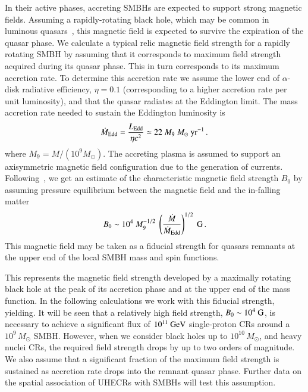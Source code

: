 \documentclass[aps,prd,twocolumn,superscriptaddress,tightenlines,nofootinbib]{revtex4-1}
\begin{document}
In their active phases, accreting SMBHs are expected to support strong
magnetic fields. Assuming a rapidly-rotating black hole, which may be
common in luminous quasars~\cite{Cao:2008pd,Volonteri:2007tu}, this
magnetic field is expected to survive the expiration of the quasar
phase. We calculate a typical relic magnetic field strength for a
rapidly rotating SMBH by assuming that it corresponds to maximum field
strength acquired during its quasar phase.  This in
turn corresponds to its maximum accretion rate. To determine this
accretion rate we assume the lower end of $\alpha$-disk radiative
efficiency, $\eta = 0.1$ (corresponding to a higher accretion rate per
unit luminosity), and that the quasar radiates at the Eddington
limit. The mass accretion rate needed to sustain the Eddington
luminosity is
\begin{equation}
\dot{M}_{\rm Edd} = \frac{L_{\rm Edd}}{\eta c^2} \simeq 22  \ M_9 \ M_\odot~{\rm yr}^{-1} \, .
\end{equation}
where $M_9 =M/(10^9 M_\odot)$. The accreting plasma is assumed to
support an axisymmetric magnetic field configuration due to the
generation of currents. Following~\cite{Boldt:1999ge}, we get an
estimate of the characteristic magnetic field strength $B_0$ by
assuming pressure equilibrium between the magnetic field and the
in-falling matter~\cite{Anchordoqui:2016dcp}
\begin{equation}
B_0 \sim 10^4 \ M_9^{-1/2} \ \left(\frac{\dot M}{\dot M_{\rm Edd}}
\right)^{1/2}~{\rm G} \, .
\label{Bp}
\end{equation}
This magnetic field may be taken as a fiducial strength for quasars
remnants at the upper end of the local SMBH mass and spin functions. 

This represents the magnetic field strength developed by a maximally
rotating black hole at the peak of its accretion phase and at the
upper end of the mass function. In the following calculations we work
with this fiducial strength, yielding. It will be seen that a relatively high
field strength, $B_0 \sim 10^4~{\rm G}$, is necessary to achieve a significant flux of
$10^{11}~{\rm GeV}$ single-proton CRs around a $10^9 \, M_\odot$
SMBH. However, when we consider black holes up to $10^{10} \,
M_\odot$, and heavy nuclei CRs, the required field strength drops by
up to two orders of magnitude. We also assume that a significant
fraction of the maximum field strength is sustained as accretion rate
drops into the remnant quasar phase. Further data on the spatial
association of UHECRs with SMBHs will test this assumption.
\end{document}
